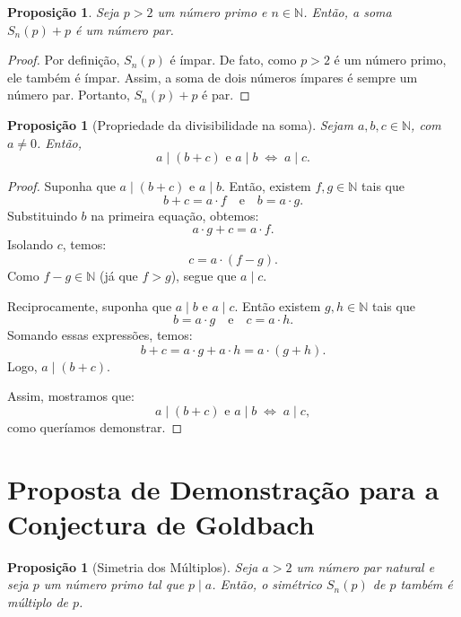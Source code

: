 \documentclass[a4paper,11pt]{article}
\newtheorem{proposition}[theorem]{Proposição}
\theoremstyle{definition}
\theoremstyle{remark}
\begin{document}
\begin{otherlanguage}{brazil}
	\begin{proposition}
		Seja \( p > 2 \) um número primo e \( n \in \mathbb{N} \). Então, a soma \( S_n(p) + p \) é um número par.
	\end{proposition}
	
	
	\begin{proof}
		Por definição, \( S_n(p) \) é ímpar. De fato, como \( p > 2 \) é um número primo, ele também é ímpar. Assim, a soma de dois números ímpares é sempre um número par. Portanto, \( S_n(p) + p \) é par. 
	\end{proof}
	
	\begin{proposition}[Propriedade da divisibilidade na soma]\label{prop:divisibilidade_na_soma}
		Sejam \( a, b, c \in \mathbb{N} \), com \( a \neq 0 \). Então,
		\[
		a \mid (b + c) \text{ e } a \mid b \;\Longleftrightarrow\; a \mid c.
		\]
	\end{proposition}
	
	\begin{proof}
		Suponha que \( a \mid (b + c) \) e \( a \mid b \). Então, existem \( f, g \in \mathbb{N} \) tais que
		\[
		b + c = a \cdot f \quad \text{e} \quad b = a \cdot g.
		\]
		Substituindo \( b \) na primeira equação, obtemos:
		\[
		a \cdot g + c = a \cdot f.
		\]
		Isolando \( c \), temos:
		\[
		c = a \cdot (f - g).
		\]
		Como \( f - g \in \mathbb{N} \) (já que \( f > g \)), segue que \( a \mid c \).
		
		Reciprocamente, suponha que \( a \mid b \) e \( a \mid c \). Então existem \( g, h \in \mathbb{N} \) tais que
		\[
		b = a \cdot g \quad \text{e} \quad c = a \cdot h.
		\]
		Somando essas expressões, temos:
		\[
		b + c = a \cdot g + a \cdot h = a \cdot (g + h).
		\]
		Logo, \( a \mid (b + c) \).
		
		Assim, mostramos que:
		\[
		a \mid (b + c) \text{ e } a \mid b \;\Longleftrightarrow\; a \mid c,
		\]
		como queríamos demonstrar.
	\end{proof}
	
	
	\section{Proposta de Demonstração para a Conjectura de Goldbach}
	\begin{proposition}[Simetria dos Múltiplos]\label{prop:simetria_dos_multiplos}
		Seja \(a > 2\) um número par natural e seja \(p\) um número primo tal que \(p \mid a\). Então, o simétrico \(S_n(p)\) de \(p\) também é múltiplo de \(p\).
	\end{proposition}
	

\end{otherlanguage}
\end{document}

